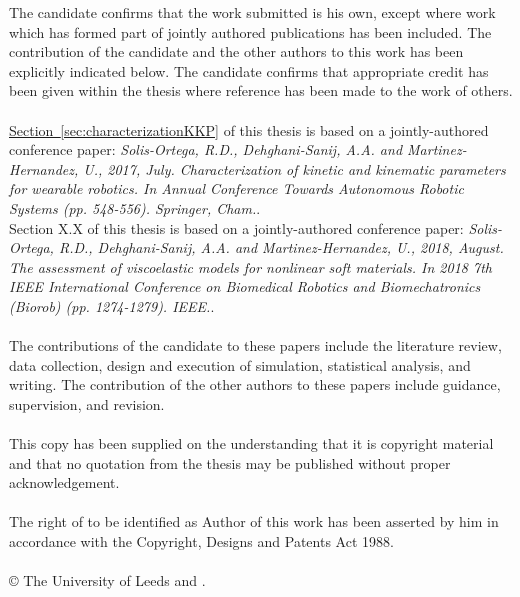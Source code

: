 
\begin{ipstatement}
The candidate confirms that the work submitted is his own, except where work which has formed part of jointly authored publications has been included. The contribution of the candidate and the other authors to this work has been explicitly indicated below. The candidate confirms that appropriate credit has been given within the thesis where reference has been made to the work of others.
\\
\\
\hyperref[sec:characterizationKKP]{Section~\ref*{sec:characterizationKKP}} of this thesis is based on a jointly-authored conference paper: \textit{Solis-Ortega, R.D., Dehghani-Sanij, A.A. and Martinez-Hernandez, U., 2017, July. Characterization of kinetic and kinematic parameters for wearable robotics. In Annual Conference Towards Autonomous Robotic Systems (pp. 548-556). Springer, Cham.}.
\\
Section X.X of this thesis is based on a jointly-authored conference paper: \textit{Solis-Ortega, R.D., Dehghani-Sanij, A.A. and Martinez-Hernandez, U., 2018, August. The assessment of viscoelastic models for nonlinear soft materials. In 2018 7th IEEE International Conference on Biomedical Robotics and Biomechatronics (Biorob) (pp. 1274-1279). IEEE.}.
\\
\\
The contributions of the candidate to these papers include the literature review, data collection, design and execution of simulation, statistical analysis, and writing. The contribution of the other authors to these papers include guidance, supervision, and revision.
\\
\\
This copy has been supplied on the understanding that it is copyright material and that no quotation from the thesis may be published without proper acknowledgement.
\\
\\
The right of \theAuthor{} to be identified as Author of this work has been asserted by him in accordance with the Copyright, Designs and Patents Act 1988.
\\
\\
\copyright{} \yeardate{\today} The University of Leeds and \theAuthor{}.

\label{ips}
\end{ipstatement}


